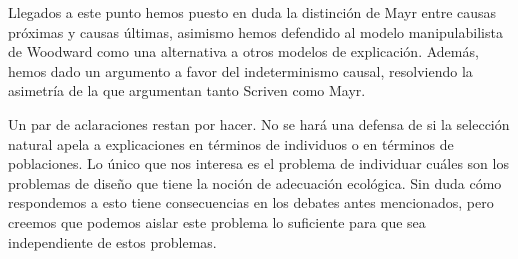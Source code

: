 Llegados a este punto hemos puesto en duda la distinción de Mayr entre causas próximas y causas últimas, asimismo hemos defendido al modelo manipulabilista de Woodward como una alternativa a otros modelos de explicación. Además, hemos dado un argumento a favor del indeterminismo causal, resolviendo la asimetría de la que argumentan tanto Scriven como Mayr.

Un par de aclaraciones restan por hacer. No se hará una defensa de si la selección natural apela a explicaciones en términos de individuos o en términos de poblaciones. Lo único que nos interesa es el problema de individuar cuáles son los problemas de diseño que tiene la noción de adecuación ecológica. Sin duda cómo respondemos a esto tiene consecuencias en los debates antes mencionados, pero creemos que podemos aislar este problema lo suficiente para que sea independiente de estos problemas.  



